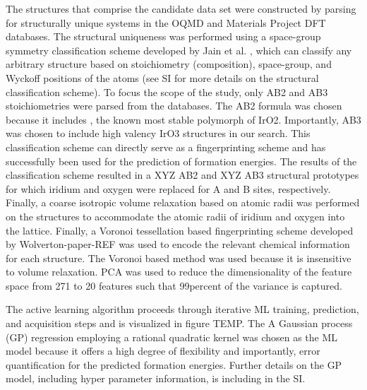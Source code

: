 

The structures that comprise the candidate data set were constructed by parsing for structurally unique systems in the OQMD and Materials Project DFT databases.
The structural uniqueness was performed using a space-group symmetry classification scheme developed by Jain et al. \cite{Jain2018}, which can classify any arbitrary structure based on stoichiometry (composition), space-group, and Wyckoff positions of the atoms
 (see SI for more details on the structural classification scheme).
To focus the scope of the study, only AB2 and AB3 stoichiometries were parsed from the databases.
The AB2 formula was chosen because it includes \rIrOtwo, the known most stable polymorph of IrO2.
Importantly, AB3 was chosen to include high valency IrO3 structures in our search.
This classification scheme can directly serve as a fingerprinting scheme and has successfully been used for the prediction of formation energies.  %
The results of the classification scheme resulted in a XYZ AB2 and XYZ AB3 structural prototypes for which iridium and oxygen were replaced for A and B sites, respectively.
Finally, a coarse isotropic volume relaxation based on atomic radii was performed on the structures to accommodate the atomic radii of iridium and oxygen into the lattice.
Finally, a Voronoi tessellation based fingerprinting scheme developed by Wolverton-paper-REF was used to encode the relevant chemical information for each structure.
The Voronoi based method was used because it is insensitive to volume relaxation.
PCA was used to reduce the dimensionality of the feature space from 271  to 20 features such that 99percent of the variance is captured.


The active learning algorithm proceeds through iterative ML training, prediction, and acquisition steps and is visualized in figure TEMP.
The
A Gaussian process (GP) regression employing a rational quadratic kernel was chosen as the ML model because it offers a high degree of flexibility and importantly, error quantification for the predicted formation energies.
Further details on the GP model, including hyper parameter information, is including in the SI.


